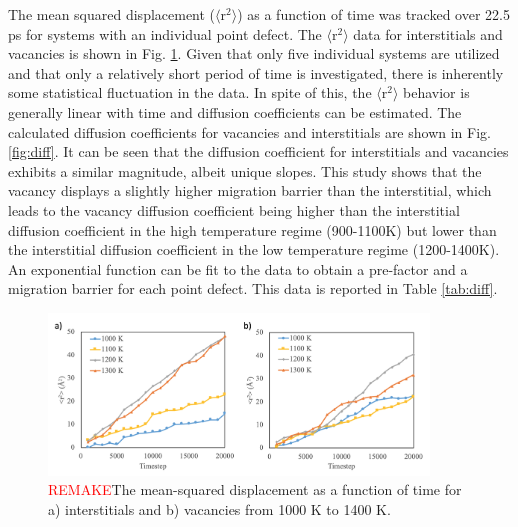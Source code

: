 \documentclass[review]{elsarticle}
\begin{document}
The mean squared displacement ($\langle$r$^2$$\rangle$) as a function of time was tracked over 22.5 ps for systems with an individual point defect. The $\langle$r$^2$$\rangle$ data for interstitials and vacancies is shown in Fig. \ref{fig:rsquare}. Given that only five individual systems are utilized and that only a relatively short period of time is investigated, there is inherently some statistical fluctuation in the data. In spite of this, the $\langle$r$^2$$\rangle$ behavior is generally linear with time and diffusion coefficients can be estimated. The calculated diffusion coefficients for vacancies and interstitials are shown in Fig. \ref{fig:diff}. It can be seen that the diffusion coefficient for interstitials and vacancies exhibits a similar magnitude, albeit unique slopes. This study shows that the vacancy displays a slightly higher migration barrier than the interstitial, which leads to the vacancy diffusion coefficient being higher than the interstitial diffusion coefficient in the high temperature regime (900-1100K) but lower than the interstitial diffusion coefficient in the low temperature regime (1200-1400K).  An exponential function can be fit to the data to obtain a pre-factor and a migration barrier for each point defect. This data is reported in Table \ref{tab:diff}. 

 \begin{figure}[h]
 \centering
 \includegraphics[width=0.9\textwidth]{msd.png} 
 \caption{\textcolor{red}{REMAKE}The mean-squared displacement as a function of time for a) interstitials and b) vacancies from 1000 K to 1400 K.  }
 \label{fig:rsquare}
\end{figure}
\end{document}
